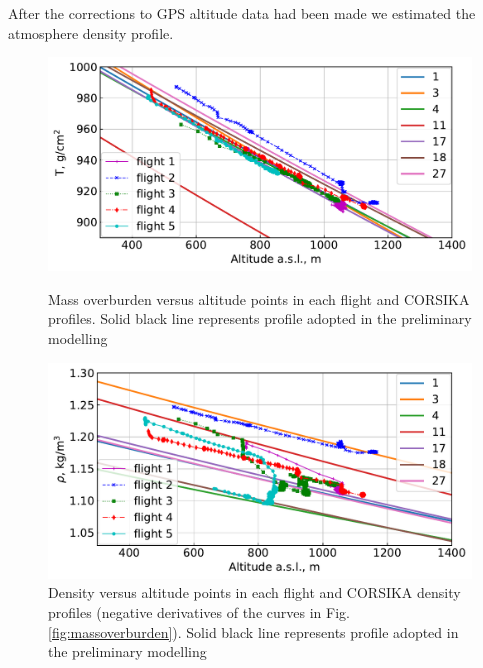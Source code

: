 \documentclass[final,5p,times,twocolumn]{elsarticle}
\begin{document}
After the corrections to GPS altitude data had been made we estimated the atmosphere density profile.

\begin{figure}[bt]
\centering
\begin{minipage}[t]{0.48\textwidth}
    \includegraphics[width=\textwidth]{figs/atmosphere_T.pdf}
    \vspace{-1.0pc}
    \caption{Mass overburden versus altitude points in each flight and CORSIKA profiles. Solid black line represents profile adopted in the preliminary modelling}
\label{fig:massoverburden}
\end{minipage}
\vfill
\vspace{1pc}
\begin{minipage}[t]{0.48\textwidth}
    \includegraphics[width=\textwidth]{figs/atmosphere_rho.pdf}
    \vspace{-1.0pc}
    \caption{Density versus altitude points in each flight and CORSIKA density profiles (negative derivatives of the curves in Fig. \ref{fig:massoverburden}). Solid black line represents profile adopted in the preliminary modelling}
\label{fig:density}
\end{minipage}
\end{figure}
\end{document}
